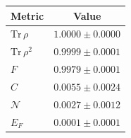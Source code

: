 \begin{tabular}{lc}
\hline
Metric & Value \\
\hline
$\mathrm{Tr}\,\rho$ & $1.0000\pm0.0000$ \\
$\mathrm{Tr}\,\rho^2$ & $0.9999\pm0.0001$ \\
$F$ & $0.9979\pm0.0001$ \\
$C$ & $0.0055\pm0.0024$ \\
$\mathcal{N}$ & $0.0027\pm0.0012$ \\
$E_F$ & $0.0001\pm0.0001$ \\
\hline
\end{tabular}